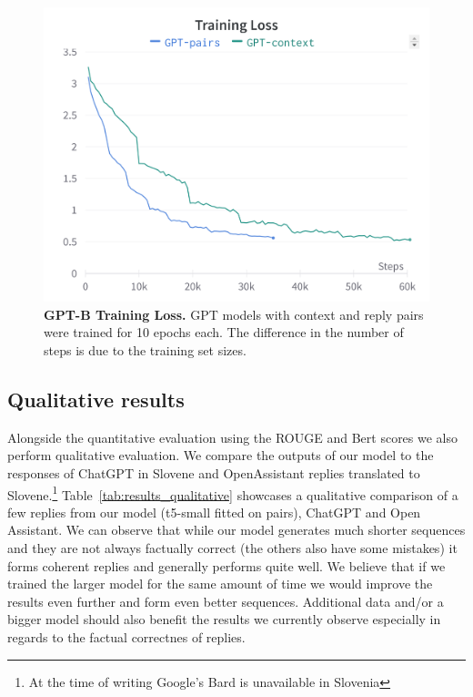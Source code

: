 \documentclass[fleqn,moreauthors,10pt]{ds_report}
\begin{document}
    \begin{figure}[h]\centering
	\includegraphics[width=\linewidth]{fig/training_loss.png}
	\caption{\textbf{GPT-B Training Loss.} GPT models with context and reply pairs were trained for 10 epochs each. The difference in the number of steps is due to the training set sizes.}
	\label{fig:training}
    \end{figure}


    

    \subsection*{Qualitative results}
    Alongside the quantitative evaluation using the ROUGE and Bert scores we also perform qualitative evaluation. We compare the outputs of our model to the responses of ChatGPT in Slovene and OpenAssistant replies translated to Slovene.\footnote{At the time of writing Google's Bard is unavailable in Slovenia}
    Table~\ref{tab:results_qualitative} showcases a qualitative comparison of a few replies from our model (t5-small fitted on pairs), ChatGPT and Open Assistant.
    We can observe that while our model generates much shorter sequences and they are not always factually correct (the others also have some mistakes) it forms coherent replies and generally performs quite well.
    We believe that if we trained the larger model for the same amount of time we would improve the results even further and form even better sequences.
    Additional data and/or a bigger model should also benefit the results we currently observe especially in regards to the factual correctnes of replies.
    
\end{document}
